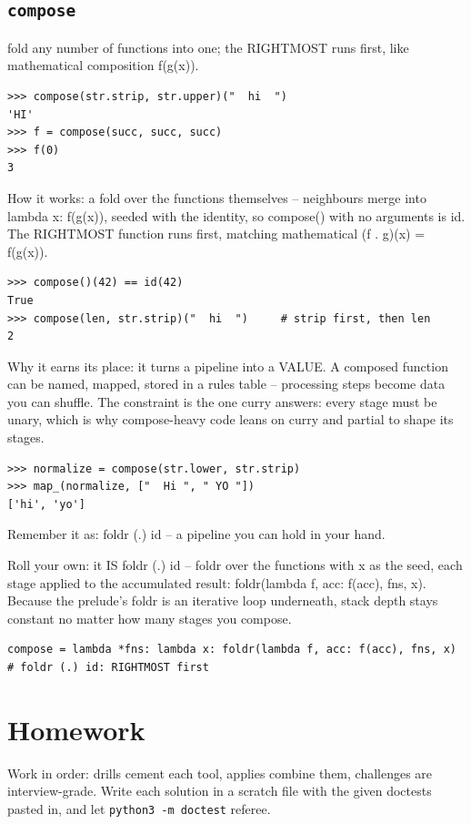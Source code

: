 \documentclass[10pt,letterpaper]{book}
\begin{document}
\subsection{\texttt{compose}}\label{def:compose}
fold any number of functions into one; the RIGHTMOST runs first, like mathematical composition f(g(x)).
\begin{lstlisting}[style=ex]
>>> compose(str.strip, str.upper)("  hi  ")
'HI'
>>> f = compose(succ, succ, succ)
>>> f(0)
3
\end{lstlisting}

How it works: a fold over the functions themselves -- neighbours merge into lambda x: f(g(x)), seeded with the identity, so compose() with no arguments is id. The RIGHTMOST function runs first, matching mathematical (f . g)(x) = f(g(x)).

\begin{lstlisting}[style=ex]
>>> compose()(42) == id(42)
True
>>> compose(len, str.strip)("  hi  ")     # strip first, then len
2
\end{lstlisting}

Why it earns its place: it turns a pipeline into a VALUE. A composed function can be named, mapped, stored in a rules table -- processing steps become data you can shuffle. The constraint is the one curry answers: every stage must be unary, which is why compose-heavy code leans on curry and partial to shape its stages.

\begin{lstlisting}[style=ex]
>>> normalize = compose(str.lower, str.strip)
>>> map_(normalize, ["  Hi ", " YO "])
['hi', 'yo']
\end{lstlisting}

Remember it as: foldr (.) id -- a pipeline you can hold in your hand.


Roll your own: it IS foldr (.) id -- foldr over the functions with x as the seed, each stage applied to the accumulated result: foldr(lambda f, acc: f(acc), fns, x). Because the prelude's foldr is an iterative loop underneath, stack depth stays constant no matter how many stages you compose.

\begin{lstlisting}[style=ex]
compose = lambda *fns: lambda x: foldr(lambda f, acc: f(acc), fns, x)  # foldr (.) id: RIGHTMOST first
\end{lstlisting}
\section{Homework}
Work in order: drills cement each tool, applies combine them,
challenges are interview-grade. Write each solution in a scratch file with
the given doctests pasted in, and let \texttt{python3 -m doctest} referee.
\end{document}
